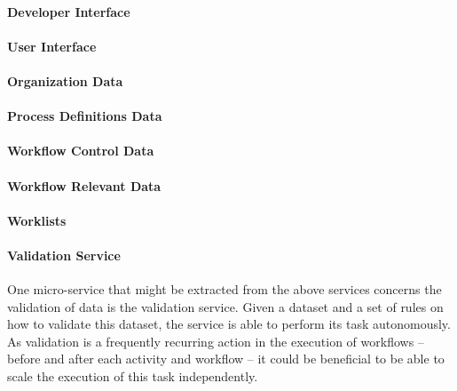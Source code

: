     \paragraph{Developer Interface} %
      \label{par:developer_interface}

    \paragraph{User Interface} %
      \label{par:user_interface}

    \paragraph{Organization Data} %
    \label{par:organization_data}

    \paragraph{Process Definitions Data} %
    \label{par:process_definitions_data}

    \paragraph{Workflow Control Data} %
    \label{par:workflow_control_data}

    \paragraph{Workflow Relevant Data} %
    \label{par:workflow_relevant_data}

    \paragraph{Worklists} %
    \label{par:worklists}


  \paragraph{Validation Service} %
    \label{par:valitation_service}
    One micro-service that might be extracted from the above services concerns the validation of data is the validation service. Given a dataset and a set of rules on how to validate this dataset, the service is able to perform its task autonomously. As validation is a frequently recurring action in the execution of workflows -- before and after each activity and workflow -- it could be beneficial to be able to scale the execution of this task independently.

